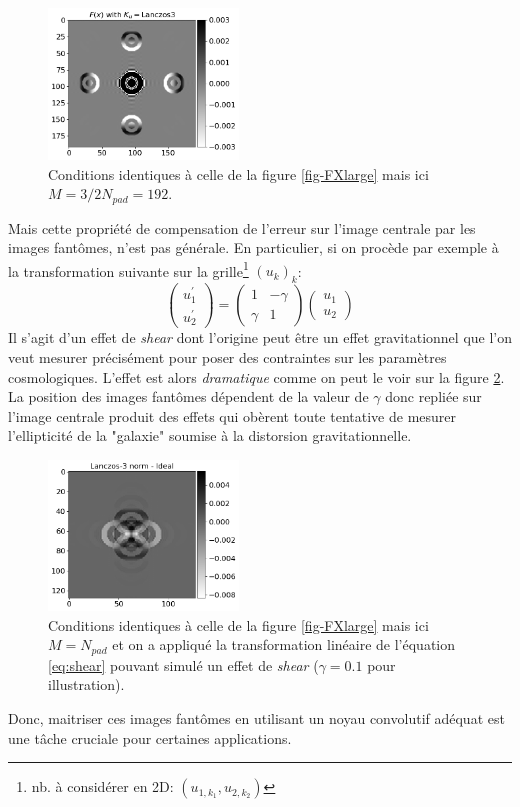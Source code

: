 \documentclass[11pt,twoside]{article}
\begin{document}
\begin{figure}
\centering
\includegraphics[width=0.45\textwidth]{fig25.png}
\caption{Conditions identiques à celle de la figure \ref{fig-FXlarge} mais ici $M=3/2 N_{pad}=192$.}
\label{fig-FXlarge2}
\end{figure}

Mais cette propriété de compensation de l'erreur sur l'image centrale par les images fantômes, n'est pas générale. En particulier, si on procède par exemple à la transformation suivante sur la grille\footnote{nb. à considérer en 2D: $(u_{1,k_1}, u_{2,k_2})$} $(u_k)_k$: 
\begin{equation}
\begin{pmatrix}
u^\prime_1 \\ u^{\prime}_2 
\end{pmatrix} = 
\begin{pmatrix}
1 & -\gamma \\ \gamma & 1
\end{pmatrix}
\begin{pmatrix}
u_1 \\ u_2 
\end{pmatrix}
\label{eq:shear}
\end{equation}
Il s'agit d'un effet de \textit{shear} dont l'origine peut être un effet gravitationnel que l'on veut mesurer précisément pour poser des contraintes sur les paramètres cosmologiques. L'effet est alors \textit{dramatique} comme on peut le voir sur la figure \ref{fig-FXlarge3}. La position des images fantômes dépendent de la valeur de $\gamma$ donc repliée sur l'image centrale produit des effets qui obèrent toute tentative de mesurer l'ellipticité de la "galaxie" soumise à la distorsion gravitationnelle.
\begin{figure}[h]
\centering
\includegraphics[width=0.45\textwidth]{fig26.png}
\caption{Conditions identiques à celle de la figure \ref{fig-FXlarge} mais ici $M= N_{pad}$ et on a appliqué la transformation linéaire de l'équation \ref{eq:shear} pouvant simulé un effet de \textit{shear} ($\gamma=0.1$ pour illustration).}
\label{fig-FXlarge3}
\end{figure}
Donc, maitriser ces images fantômes en utilisant un noyau convolutif adéquat est une tâche cruciale pour certaines applications.
\end{document}
